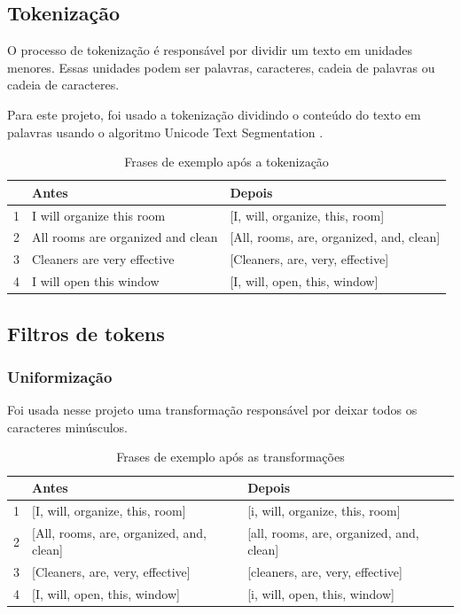 \subsection{Tokenização}
O processo de tokenização é responsável por dividir um texto em unidades menores. Essas unidades podem ser palavras, caracteres, cadeia de palavras ou cadeia de caracteres. 

Para este projeto, foi usado a tokenização dividindo o conteúdo do texto em palavras usando o algoritmo Unicode Text Segmentation \cite{unicodesegmentation}.

\begin{table}[htb]
	\centering
    \def\arraystretch{1.2} %
    \begin{tabular}{|l|l|l|}
        \hline
        & \textbf{Antes} & \textbf{Depois} \\ \hline
        1 & I will organize this room & [I, will, organize, this, room]            \\ \hline
        2 & All rooms are organized and clean & [All, rooms, are, organized, and, clean] \\ \hline
        3 & Cleaners are very effective & [Cleaners, are, very, effective]                              \\ \hline
        4 & I will open this window & [I, will, open, this, window]                             \\ \hline
    \end{tabular}
	\caption{Frases de exemplo após a tokenização}
    \label{tab:tokenization}
\end{table}

\subsection{Filtros de tokens}
\subsubsection{Uniformização}
 Foi usada nesse projeto uma transformação responsável por deixar todos os caracteres minúsculos.

\begin{table}[htb]
	\centering
    \def\arraystretch{1.2} %
    \begin{tabular}{|l|l|l|}
        \hline
        & \textbf{Antes} & \textbf{Depois} \\ \hline
        1 & [I, will, organize, this, room] & [i, will, organize, this, room]            \\ \hline
        2 & [All, rooms, are, organized, and, clean] & [all, rooms, are, organized, and, clean] \\ \hline
        3 & [Cleaners, are, very, effective] & [cleaners, are, very, effective]                              \\ \hline
        4 & [I, will, open, this, window] & [i, will, open, this, window]                             \\ \hline
    \end{tabular}
	\caption{Frases de exemplo após as transformações}
    \label{tab:transformations}
\end{table}

